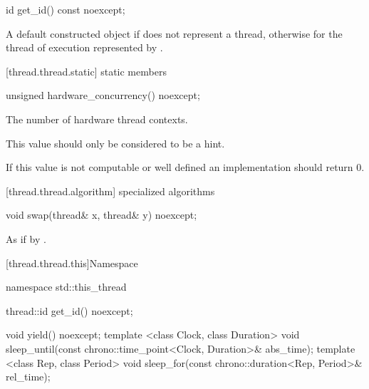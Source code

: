 %
%
\begin{itemdecl}
id get_id() const noexcept;
\end{itemdecl}

\begin{itemdescr}
\pnum
\returns A default constructed  object if  does not represent a thread,
otherwise  for the thread of execution represented by
.
\end{itemdescr}

[thread.thread.static]{ static members}

%
%
\begin{itemdecl}
unsigned hardware_concurrency() noexcept;
\end{itemdecl}

\begin{itemdescr}
\pnum
\returns The number of hardware thread contexts. \begin{note} This value should
only be considered to be a hint. \end{note} If this value is not computable or
well defined an implementation should return 0.
\end{itemdescr}

[thread.thread.algorithm]{ specialized algorithms}

%
%
\begin{itemdecl}
void swap(thread& x, thread& y) noexcept;
\end{itemdecl}

\begin{itemdescr}
\pnum\effects As if by .
\end{itemdescr}

[thread.thread.this]{Namespace }

\begin{codeblock}
namespace std::this_thread {
  thread::id get_id() noexcept;

  void yield() noexcept;
  template <class Clock, class Duration>
    void sleep_until(const chrono::time_point<Clock, Duration>& abs_time);
  template <class Rep, class Period>
    void sleep_for(const chrono::duration<Rep, Period>& rel_time);
}
\end{codeblock}


